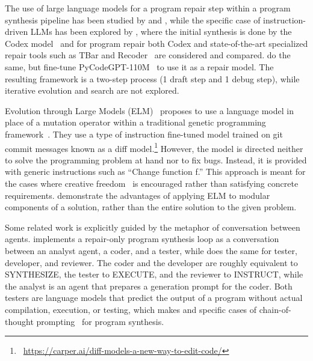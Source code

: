 The use of large language models for a program repair step within a program synthesis pipeline has been studied by \cite{joshi2022:repair} and \cite{guptaSynthesizeExecuteDebug2020}, 
while the specific case of instruction-driven LLMs has been explored by \cite{fanAutomatedRepairPrograms2023}, where the initial synthesis is done by the Codex model~\cite{chenEvaluatingLargeLanguage2021} and for program repair both Codex and state-of-the-art specialized repair tools such as TBar and Recoder~\cite{just2014:defects4j} are considered and compared. 
\cite{zhangSelfEditFaultAwareCode2023} do the same, but fine-tune PyCodeGPT-110M~\cite{zanCERTContinualPretraining2022} to use it as a repair model. 
The resulting framework is a two-step process (1 draft step and 1 debug step), while iterative evolution and search are not explored. 

Evolution through Large Models (ELM)~\cite{lehmanEvolutionLargeModels2022} proposes to use a language model in place of a mutation operator within a traditional genetic programming framework~\cite{koza1994:genetic}. They use a type of instruction fine-tuned model trained on git commit messages known as a diff model.\footnote{~\url{https://carper.ai/diff-models-a-new-way-to-edit-code/}}
However, the model is directed neither to solve the programming problem at hand nor to fix bugs.
Instead, it is provided with generic instructions such as ``Change function f.'' 
This approach is meant for the cases where creative freedom~\cite{stanleyWhyGreatnessCannot2015a} is encouraged rather than satisfying concrete requirements.
\cite{liu2023algorithm} demonstrate the advantages of applying ELM to modular components of a solution, rather than the entire solution to the given problem.

Some related work is explicitly guided by the metaphor of conversation between agents. 
\cite{zhang2023steam} implements a repair-only program synthesis loop as a conversation between an analyst agent, a coder, and a tester, while \cite{dongSelfcollaborationCodeGeneration2023} does the same for tester, developer, and reviewer. 
The coder and the developer are roughly equivalent to SYNTHESIZE, the tester to EXECUTE, and the reviewer to INSTRUCT, while the analyst is an agent that prepares a generation prompt for the coder. 
Both testers are language models that predict the output of a program without actual compilation, execution, or testing, which makes \cite{dongSelfcollaborationCodeGeneration2023} and \cite{zhang2023steam} specific cases of chain-of-thought prompting~\cite{yuBetterChainofThoughtPrompting2023} for program synthesis.

